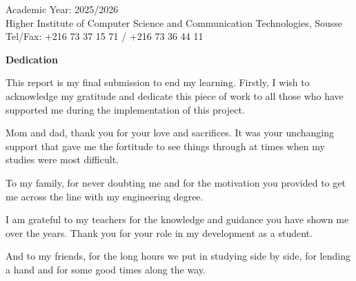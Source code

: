 \documentclass[12pt,a4paper]{report}
\begin{document}
\begin{center}
\vfill

{\small Academic Year: 2025/2026}\\[0.2cm]

\footnotesize
Higher Institute of Computer Science and Communication Technologies, Sousse\\
Tel/Fax: +216 73 37 15 71 / +216 73 36 44 11

\end{center}

\cleardoublepage
{}
\thispagestyle{empty}

\begin{center}
{\LARGE \textbf{Dedication}}
\end{center}

\vspace{1cm}

\linespread{1.3}\selectfont
\large

This report is my final submission to end my learning. Firstly, I wish to acknowledge my gratitude and dedicate this piece of work to all those who have supported me during the implementation of this project.

\vspace{0.8cm}

Mom and dad, thank you for your love and sacrifices. It was your unchanging support that gave me the fortitude to see things through at times when my studies were most difficult.

\vspace{0.8cm}

To my family, for never doubting me and for the motivation you provided to get me across the line with my engineering degree.

\vspace{0.8cm}

I am grateful to my teachers for the knowledge and guidance you have shown me over the years. Thank you for your role in my development as a student.

\vspace{0.8cm}

And to my friends, for the long hours we put in studying side by side, for lending a hand and for some good times along the way.

\vspace{0.8cm}
\end{document}
